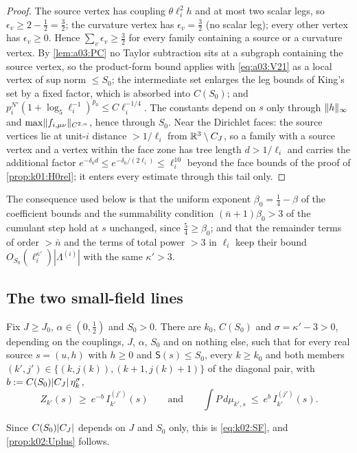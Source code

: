 \begin{proof}
The source vertex has coupling $\theta\ell_i^2h$ and at most two scalar legs, so $\epsilon_v\ge2-\frac12=\frac32$; the curvature vertex \cite[(3.20)]{K1} has $\epsilon_v=\frac32$ (no scalar leg); every other vertex has $\epsilon_v\ge0$. Hence $\sum_v\epsilon_v\ge\frac32$ for every family containing a source or a curvature vertex. By \cref{lem:a03:PC} no Taylor subtraction sits at a subgraph containing the source vertex, so the product-form bound applies with \eqref{eq:a03:V21} as a local vertex of sup norm $\le S_0$; the intermediate set enlarges the leg bounds of King's set \cite[(3.2)]{K1} by a fixed factor, which is absorbed into $C(S_0)$; and $p_i^{N'}(1+\log_5\ell_i^{-1})^{p_0}\le C\ell_i^{-1/4}$. The constants depend on $s$ only through $\lVert h\rVert_\infty$ and $\max\lVert f_{i,\mu\nu}\rVert_{C^{2,\alpha}}$, hence through $S_0$. Near the Dirichlet faces: the source vertices lie at unit-$i$ distance $>1/\ell_i$ from $\mathbb R^3\setminus C_J$, so a family with a source vertex and a vertex within the face zone has tree length $d>1/\ell_i$ and carries the additional factor $e^{-\delta_0d}\le e^{-\delta_0/(2\ell_i)}\le\ell_i^{10}$ beyond the face bounds of the proof of \cref{prop:k01:H0rel}; it enters every estimate through this tail only.
\end{proof}

The consequence used below is that the uniform exponent $\beta_0=\frac14-\beta$ of the coefficient bounds \cite[Prop.~3.2]{Ba1} and the summability condition $(\bar n+1)\beta_0>3$ of the cumulant step hold at $s$ unchanged, since $\frac54\ge\beta_0$; and that the remainder terms of order $>\bar n$ and the terms of total power $>3$ in $\ell_i$ \cite[Prop.~3.1]{Ba1} keep their bound $O_{S_0}(\ell_i^{\kappa'})|\Lambda^{(i)}|$ with the same $\kappa'>3$.

\subsection{The two small-field lines}\label{ssec:a03:SF}

\begin{theorem}\label{thm:a03:SF}
Fix $J\ge J_0$, $\alpha\in(0,\frac12)$ and $S_0>0$. There are $k_0$, $C(S_0)$ and $\sigma=\kappa'-3>0$, depending on the couplings, $J$, $\alpha$, $S_0$ and on nothing else, such that for every real source $s=(u,h)$ with $h\ge0$ and $\mathsf S(s)\le S_0$, every $k\ge k_0$ and both members $(k',j')\in\{(k,j(k)),(k+1,j(k)+1)\}$ of the diagonal pair, with $b:= C(S_0)|C_J|\,\eta_k^{\sigma}$,
\[
Z_{k'}(s)\ \ge\ e^{-b}\,I^{(j')}_{k'}(s)\qquad\text{and}\qquad\int P\,d\mu_{k',s}\ \le\ e^{b}\,I^{(j')}_{k'}(s).
\]
\end{theorem}
\noindent Since $C(S_0)|C_J|$ depends on $J$ and $S_0$ only, this is \eqref{eq:k02:SF}, and \cref{prop:k02:Uplus} follows.

